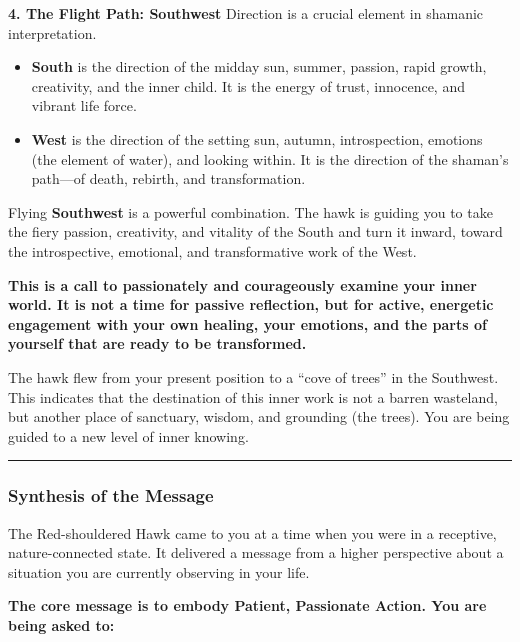 \documentclass{article}
\begin{document}
\textbf{4. The Flight Path: Southwest} Direction is a crucial element in shamanic interpretation.

\begin{itemize}
\item
  \textbf{South} is the direction of the midday sun, summer, passion, rapid growth, creativity, and the inner child. It is the energy of trust, innocence, and vibrant life force.
\item
  \textbf{West} is the direction of the setting sun, autumn, introspection, emotions (the element of water), and looking within. It is the direction of the shaman's path---of death, rebirth, and transformation.
\end{itemize}

Flying \textbf{Southwest} is a powerful combination. The hawk is guiding you to take the fiery passion, creativity, and vitality of the South and turn it inward, toward the introspective, emotional, and transformative work of the West.

\textbf{This is a call to passionately and courageously examine your inner world. It is not a time for passive reflection, but for active, energetic engagement with your own healing, your emotions, and the parts of yourself that are ready to be transformed.}

The hawk flew from your present position to a ``cove of trees'' in the Southwest. This indicates that the destination of this inner work is not a barren wasteland, but another place of sanctuary, wisdom, and grounding (the trees). You are being guided to a new level of inner knowing.

\begin{center}\rule{0.5\linewidth}{0.5pt}\end{center}

\subsubsection*{Synthesis of the Message}\label{synthesis-of-the-message}

The Red-shouldered Hawk came to you at a time when you were in a receptive, nature-connected state. It delivered a message from a higher perspective about a situation you are currently observing in your life.

\textbf{The core message is to embody Patient, Passionate Action. You are being asked to:}
\end{document}
